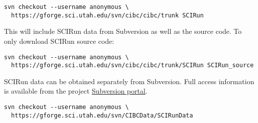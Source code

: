 \documentclass[fleqn,12pt,openany]{book}
\begin{document}
\begin{verbatim}
svn checkout --username anonymous \
  https://gforge.sci.utah.edu/svn/cibc/cibc/trunk SCIRun
\end{verbatim}

\noindent This will include SCIRun data from Subversion as well as the source code.
To only download SCIRun source code:

\begin{verbatim}
svn checkout --username anonymous \
  https://gforge.sci.utah.edu/svn/cibc/cibc/trunk/SCIRun SCIRun_source
\end{verbatim}

SCIRun data can be obtained separately from Subversion.
Full access information is available from the project
\href{https://gforge.sci.utah.edu/gf/project/CIBCData/scmsvn/?action=AccessInfo}{Subversion portal}.

\begin{verbatim}
svn checkout --username anonymous \
  https://gforge.sci.utah.edu/svn/CIBCData/SCIRunData
\end{verbatim}
\end{document}
